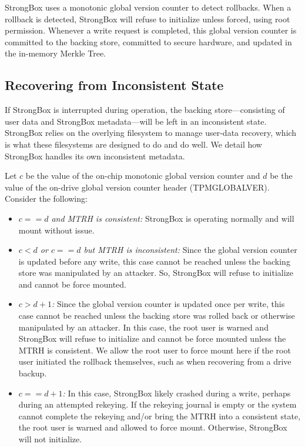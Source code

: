 StrongBox uses a monotonic global version counter to detect rollbacks.
When a rollback is detected, StrongBox will refuse to initialize
unless forced, using root permission. Whenever a write request is
completed, this global version counter is committed to the backing
store, committed to secure hardware, and updated in the in-memory
Merkle Tree.

\subsection{Recovering from Inconsistent State}

If StrongBox is interrupted during operation, the backing store---consisting of
user data and StrongBox metadata---will be left in an inconsistent state.
StrongBox relies on the overlying filesystem  to manage user-data
recovery, which is what these filesystems are designed to do and do well. We
detail how StrongBox handles its own inconsistent metadata.

Let $c$ be the value of the on-chip monotonic global version counter and $d$ be
the value of the on-drive global version counter header (TPMGLOBALVER). Consider
the following:

\begin{itemize}

\item \emph{$c == d$ and MTRH is consistent:} StrongBox is operating
  normally and will mount without issue.

\item \emph{$c<d$ or $c == d$ but MTRH is inconsistent:} Since the
  global version counter is updated before any write, this case cannot
  be reached unless the backing store was manipulated by an attacker.
  So, StrongBox will refuse to initialize and cannot be force mounted.

\item \emph{$c > d + 1$:} Since the global version counter is updated
  once per write, this case cannot be reached unless the backing store
  was rolled back or otherwise manipulated by an attacker. In this
  case, the root user is warned and StrongBox will refuse to
  initialize and cannot be force mounted unless the MTRH is
  consistent. We allow the root user to force mount here if the root
  user initiated the rollback themselves, such as when recovering from
  a drive backup.

\item \emph{$c == d + 1$:} In this case, StrongBox likely crashed
  during a write, perhaps during an attempted rekeying. If the
  rekeying journal is empty or the system cannot complete the rekeying
  and/or bring the MTRH into a consistent state, the root user is
  warned and allowed to force mount. Otherwise, StrongBox will not
  initialize.

\end{itemize}

